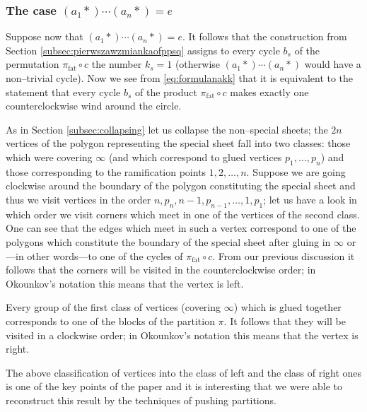 \documentclass[12pt,dvips]{amsart}
\numberwithin{equation}{section} \numberwithin{figure}{section}
\theoremstyle{plain}
\theoremstyle{definition}
\theoremstyle{remark}
\newcommand{\xtra}{\ast}
\DeclareMathOperator{\fat}{fat}
\begin{document}
\subsubsection{The case $(a_1 \xtra) \cdots (a_n \xtra)=e$}
Suppose now that $(a_1 \xtra)\cdots(a_n \xtra)=e$. It follows that
the construction from Section \ref{subsec:pierwszawzmiankaofppsq}
assigns to every cycle $b_s$ of the permutation $\pi_{\fat} \circ c$
the number $k_s=1$ (otherwise $(a_1 \xtra)\cdots(a_n \xtra)$ would
have a non--trivial cycle). Now we see from \eqref{eq:formulanakk}
that it is equivalent to the statement that every cycle $b_s$ of the
product $\pi_{\fat}\circ c$ makes exactly one counterclockwise wind
around the circle.


As in Section \ref{subsec:collapsing} let us collapse the
non--special sheets; the $2n$ vertices of the polygon representing
the special sheet fall into two classes: those which were covering
$\infty$ (and which correspond to glued vertices $p_1,\dots,p_n$)
and those corresponding to the ramification points $1,2,\dots,n$.
Suppose we are going clockwise around the boundary of the polygon
constituting the special sheet and thus we visit vertices in the
order $n,p_n,n-1,p_{n-1},\dots,1,p_1$; let us have a look in which
order we visit corners which meet in one of the vertices of the
second class. One can see that the edges which meet in such a vertex
correspond to one of the polygons which constitute the boundary of
the special sheet after gluing in $\infty$ or---in other words---to
one of the cycles of $\pi_{\fat}\circ c$. From our previous
discussion it follows that the corners will be visited in the
counterclockwise order; in Okounkov's notation this means that the
vertex is left.

Every group of the first class of vertices (covering $\infty$) which
is glued together corresponds to one of the blocks of the partition
$\pi$.
It follows that they will be visited in a clockwise order; in
Okounkov's notation this means that the vertex is right.

The above classification of vertices into the class of left and the
class of right ones is one of the key points of the paper
\cite{Okounkov2000randompermutations} and it is interesting that we
were able to reconstruct this result by the techniques of pushing
partitions.
\end{document}
